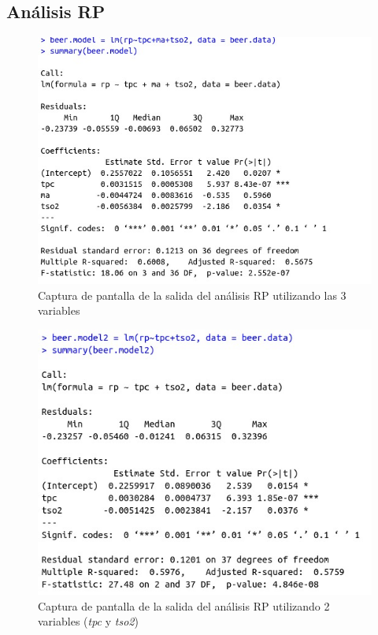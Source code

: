 \documentclass{article}
\begin{document}
\newpage
\subsection{Análisis RP}

\begin{figure}[htbp]
    \centering
    \includegraphics[scale=0.4]{images/rp_analisis_3_variables.jpeg}
    \caption{Captura de pantalla de la salida del análisis RP utilizando las 3 variables}
    \label{fig:rp_3_variables}
\end{figure}


\begin{figure}[htbp]
    \centering
    \includegraphics[scale=0.4]{images/rp_analisis_2_variables.jpeg}
    \caption{Captura de pantalla de la salida del análisis RP utilizando 2 variables (\textit{tpc} y \textit{tso2})}
    \label{fig:rp_2_variables}
\end{figure}
\end{document}
